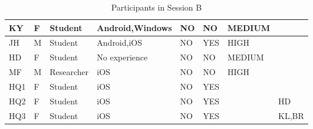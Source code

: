 \begin{table}[H]
{\begin{tabular}{|l|l|l|l|l|l|l|l|}
KY       & F      & Student    & Android,Windows                                                 & NO                                                                 & NO                                                                   & MEDIUM                                                       &                                                                    \\ \hline
JH       & M      & Student    & Android,iOS                                                     & NO                                                                 & YES                                                                  & HIGH                                                         &                                                                    \\ \hline
HD       & F      & Student    & No experience                                                   & NO                                                                 & NO                                                                   & MEDIUM                                                       &                                                                    \\ \hline
MF       & M      & Researcher & iOS                                                             & NO                                                                 & NO                                                                   & HIGH                                                         &                                                                    \\ \hline
HQ1      & F      & Student    & iOS                                                             & NO                                                                 & YES                                                                  &                                                              &                                                                    \\ \hline
HQ2      & F      & Student    & iOS                                                             & NO                                                                 & YES                                                                  &                                                              & HD                                                                 \\ \hline
HQ3      & F      & Student    & iOS                                                             & NO                                                                 & YES                                                                  &                                                              & KL,BR                                                              \\ \hline
\end{tabular}}
\caption{Participants in Session B}
\end{table}

